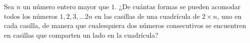 Sea $n$ un número entero mayor que $1$. ¿De cuántas formas se pueden acomodar todos los números $1,2,3,\dots 2n$ en las casillas de una cuadrícula de $2\times n$, uno en cada casilla, de manera que cualesquiera dos números consecutivos se encuentren en casillas que comparten un lado en la cuadrícula?